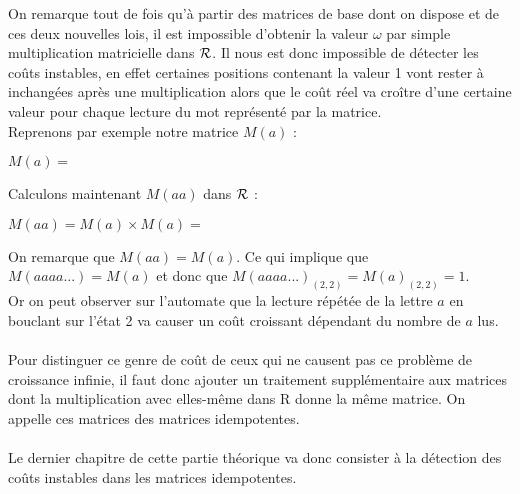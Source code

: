 \documentclass{report}
\begin{document}
On remarque tout de fois qu'à partir des matrices de base dont on dispose et de ces deux nouvelles lois, il est impossible d'obtenir la valeur $\omega$ par simple multiplication matricielle dans $\mathcal{R}$. Il nous est donc impossible de détecter les coûts instables, en effet certaines positions contenant la valeur 1 vont rester à inchangées après une multiplication alors que le coût réel va croître d'une certaine valeur pour chaque lecture du mot représenté par la matrice.\\

Reprenons par exemple notre matrice $M(a)$ : \\
\begin{center}
$M(a)=$
\end{center}

Calculons maintenant $M(aa)$ dans $\mathcal{R}$ :

\begin{center}
$M(aa) = M(a) \times M(a) =$
\end{center}

On remarque que $M(aa) = M(a)$. Ce qui implique que $M(aaaa...) = M(a)$ et donc que $M(aaaa...)_{(2,2)} = M(a)_{(2,2)}=1$. \\
Or on peut observer sur l'automate que la lecture répétée de la lettre $a$ en bouclant sur l'état 2 va causer un coût croissant dépendant du nombre de $a$ lus. \\\\
Pour distinguer ce genre de coût de ceux qui ne causent pas ce problème de croissance infinie, il faut donc ajouter un traitement supplémentaire aux matrices dont la multiplication avec elles-même dans R donne la même matrice. On appelle ces matrices des matrices idempotentes.\\\\
Le dernier chapitre de cette partie théorique va donc consister à la détection des coûts instables dans les matrices idempotentes.
\end{document}

